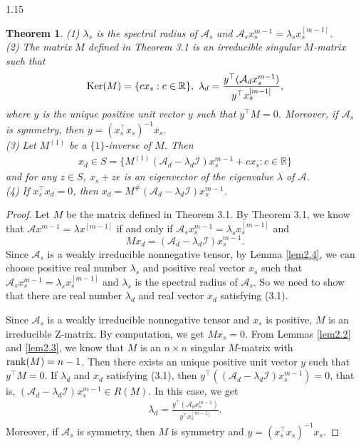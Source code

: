 \documentclass[preprint,12pt]{elsarticle}
\newtheorem{thm}{Theorem}[section]
\begin{document}
\begin{spacing}{1.15}
\begin{thm}
(1) $\lambda_s$ is the spectral radius of $\mathcal{A}_s$ and $\mathcal{A}_sx_s^{m-1}=\lambda_sx_s^{[m-1]}$.\\
(2) The matrix $M$ defined in Theorem 3.1 is an irreducible singular $M$-matrix such that
\begin{eqnarray*}
{\rm Ker}(M)=\{cx_s:c\in\mathbb{R}\},~\lambda_d=\frac{y^\top(\mathcal{A}_dx_s^{m-1})}{y^\top x_s^{[m-1]}},
\end{eqnarray*}
where $y$ is the unique positive unit vector $y$ such that $y^\top M=0$. Moreover, if $\mathcal{A}_s$ is symmetry, then $y=(x_s^\top x_s)^{-1}x_s$.\\
(3) Let $M^{(1)}$ be a $\{1\}$-inverse of $M$. Then
\begin{eqnarray*}
x_d\in S=\{M^{(1)}(\mathcal{A}_d-\lambda_d\mathcal{I})x_s^{m-1}+cx_s:c\in\mathbb{R}\}
\end{eqnarray*}
and for any $z\in S$, $x_s+z\epsilon$ is an eigenvector of the eigenvalue $\lambda$ of $\mathcal{A}$.\\
(4) If $x_s^\top x_d=0$, then $x_d=M^\#(\mathcal{A}_d-\lambda_d\mathcal{I})x_s^{m-1}$.
\end{thm}
\begin{proof}
Let $M$ be the matrix defined in Theorem 3.1. By Theorem 3.1, we know that $\mathcal{A}x^{m-1}=\lambda x^{[m-1]}$ if and only if $\mathcal{A}_sx_s^{m-1}=\lambda_sx_s^{[m-1]}$ and
\begin{equation}
Mx_d=(\mathcal{A}_d-\lambda_d\mathcal{I})x_s^{m-1}.\tag{3.1}
\end{equation}
Since $\mathcal{A}_s$ is a weakly irreducible nonnegative tensor, by Lemma \ref{lem2.4}, we can choose positive real number $\lambda_s$ and positive real vector $x_s$ such that $\mathcal{A}_sx_s^{m-1}=\lambda_sx_s^{[m-1]}$ and $\lambda_s$ is the spectral radius of $\mathcal{A}_s$. So we need to show that there are real number $\lambda_d$ and real vector $x_d$ satisfying (3.1).

Since $\mathcal{A}_s$ is a weakly irreducible nonnegative tensor and $x_s$ is positive, $M$ is an irreducible Z-matrix. By computation, we get $Mx_s=0$. From Lemmas \ref{lem2.2} and \ref{lem2.3}, we know that $M$ is an $n\times n$ singular $M$-matrix with ${\rm rank}(M)=n-1$. Then there exists an unique positive unit vector $y$ such that $y^\top M=0$. If $\lambda_d$ and $x_d$ satisfying (3.1), then $y^\top((\mathcal{A}_d-\lambda_d\mathcal{I})x_s^{m-1})=0$, that is, $(\mathcal{A}_d-\lambda_d\mathcal{I})x_s^{m-1}\in R(M)$. In this case, we get
\begin{eqnarray*}
\lambda_d=\frac{y^\top(\mathcal{A}_dx_s^{m-1})}{y^\top x_s^{[m-1]}}.
\end{eqnarray*}
Moreover, if $\mathcal{A}_s$ is symmetry, then $M$ is symmetry and $y=(x_s^\top x_s)^{-1}x_s$.


\end{proof}
\end{spacing}
\end{document}
